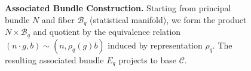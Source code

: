 \begin{figure}[h]
\caption{%
\textbf{Associated Bundle Construction.} Starting from principal bundle $N$ and fiber $\mathcal{B}_q$ (statistical manifold), we form the product $N \times \mathcal{B}_q$ and quotient by the equivalence relation $(n \cdot g, b) \sim (n, \rho_q(g)b)$ induced by representation $\rho_q$. The resulting associated bundle $E_q$ projects to base $\mathcal{C}$.
}
\label{fig:associated_bundle}
\end{figure}

